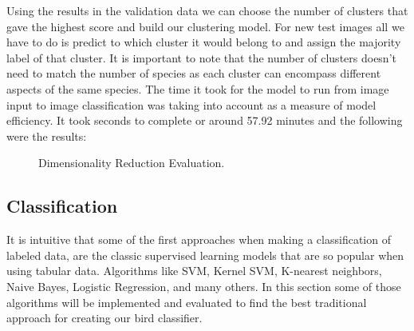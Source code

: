 \documentclass[11pt]{article}
\begin{document}
\begin{singlespace}
Using the results in the validation data we can choose the number of clusters that gave the highest score and build our clustering model. For new test images all we have to do is predict to which cluster it would belong to and assign the majority label of that cluster. It is important to note that the number of clusters doesn't need to match the number of species as each cluster can encompass different aspects of the same species. The time it took for the model to run from image input to image classification was taking into account as a measure of model efficiency. It took seconds to complete or around 57.92 minutes and the following were the results: \\

\begin{figure}[h]
    \centering
    
    \caption{Dimensionality Reduction Evaluation.}
\end{figure} 


\subsection{Classification}
It is intuitive that some of the first approaches when making a classification of labeled data, are the classic supervised learning models that are so popular when using tabular data. Algorithms like SVM, Kernel SVM, K-nearest neighbors, Naive Bayes, Logistic Regression, and many others. In this section some of those algorithms will be implemented and evaluated to find the best traditional approach for creating our bird classifier. \\




\end{singlespace}
\end{document}
